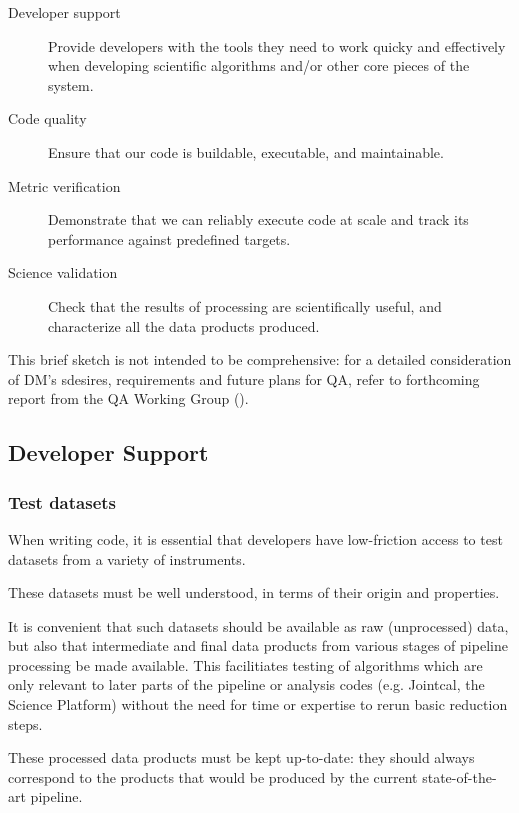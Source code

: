 \documentclass[DM,authoryear,toc,lsstdraft]{lsstdoc}
\begin{document}
\begin{description}

\item[Developer support]{Provide developers with the tools they need to work
quicky and effectively when developing scientific algorithms and/or other core
pieces of the system.}

\item[Code quality]{Ensure that our code is buildable, executable, and
maintainable.}

\item[Metric verification]{Demonstrate that we can reliably execute code at
scale and track its performance against predefined targets.}

\item[Science validation]{Check that the results of processing are
scientifically useful, and characterize all the data products produced.}

\end{description}

This brief sketch is not intended to be comprehensive: for a detailed
consideration of DM's sdesires, requirements and future plans for QA, refer to
forthcoming report from the QA Working Group ().

\subsection{Developer Support}

\subsubsection{Test datasets}

When writing code, it is essential that developers have low-friction access to
test datasets from a variety of instruments.

These datasets must be well understood, in terms of their origin and
properties.

It is convenient that such datasets should be available as raw (unprocessed)
data, but also that intermediate and final data products from various stages
of pipeline processing be made available. This facilitiates testing of
algorithms which are only relevant to later parts of the pipeline or analysis
codes (e.g. Jointcal, the Science Platform) without the need for time or
expertise to rerun basic reduction steps.

These processed data products must be kept up-to-date: they should always
correspond to the products that would be produced by the current
state-of-the-art pipeline.
\end{document}

